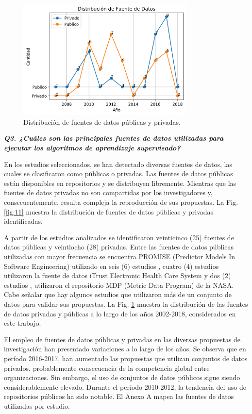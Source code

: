 \documentclass[journal]{IEEEtran}
\begin{document}
\begin{figure}[!t]
\centering
\includegraphics[width=3.5in]{figures/Figure12_Guada.png}
\caption{Distribución de fuentes de datos públicas y privadas.}
\label{fig:12}
\end{figure}

\emph{\textbf{Q3. ¿Cuáles son las principales fuentes de datos utilizadas para ejecutar los algoritmos de aprendizaje supervisado?} } 

En los estudios seleccionados, se han detectado diversas fuentes de datos, las cuales se clasificaron como públicas o privadas. Las fuentes de datos públicas están disponibles en repositorios y se distribuyen libremente. Mientras que las fuentes de datos privadas no son compartidas por los investigadores y, consecuentemente, resulta compleja la reproducción de sus propuestas. La Fig. \ref{fig:11} muestra la distribución de fuentes de datos públicas y privadas identificadas.

A partir de los estudios analizados se identificaron veinticinco (25) fuentes de datos públicas y veintiocho (28) privadas. Entre las fuentes de datos públicas utilizadas con mayor frecuencia se encuentra PROMISE (Predictor Models In Software Engineering) utilizado en seis (6) estudios \cite{Jindal20162027,dekhtyar2017re,abad2017works,Slankas2013,fitzgerald2012early,malhotra2017exploratory}, cuatro (4) estudios utilizaron la fuente de datos iTrust Electronic Health Care System \cite{Slankas2013,Slankas2013a,winkler2016automatic,sharma2014automated} y dos (2) estudios \cite{fitzgerald2012early}, \cite{malhotra2017exploratory} utilizaron el repositorio MDP (Metric Data Program) de la NASA. Cabe señalar que hay algunos estudios que utilizaron más de un conjunto de datos para validar sus propuestas. La Fig. \ref{fig:12} muestra la distribución de las fuentes de datos privadas y públicas a lo largo de los años 2002-2018, considerados en este trabajo.

El empleo de fuentes de datos públicas y privadas en las diversas propuestas de investigación han presentado variaciones a lo largo de los años. Se observa que en período 2016-2017, han aumentado las propuestas que utilizan conjuntos de datos privados, probablemente consecuencia de la competencia global entre organizaciones. Sin embargo, el uso de conjuntos de datos públicos sigue siendo considerablemente elevado. Durante el período 2010-2012, la tendencia del uso de repositorios públicos ha sido notable. El Anexo A mapea las fuentes de datos utilizadas por estudio.
\end{document}
